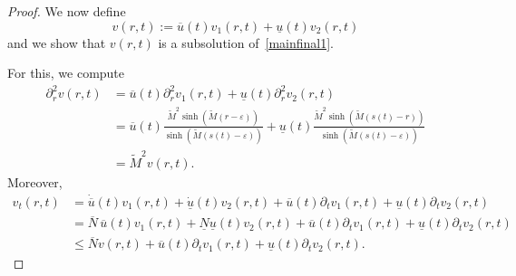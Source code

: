 \documentclass[12pt,a4paper,intlimits,sumlimits]{amsart}
\theoremstyle{definition}
\theoremstyle{plain}
\numberwithin{equation}{section}
\renewcommand{\leq}{\leqslant}
\begin{document}
\begin{proof}
We now define 
\[
v(r,t):=\overline{u}(t)v_1(r,t)+\underline{u}(t)v_2(r,t)
\]
and we show that $v(r, t)$ is a subsolution of~\eqref{mainfinal1}.

For this, we compute
\begin{equation}\label{xdftygvbnji}
\begin{split}
\partial^2_r v(r,t)&= \overline{u}(t)\partial^2_r v_1(r,t)+\underline{u}(t)\partial^2_r v_2(r,t)\\&=
\overline{u}(t)
\frac{\widetilde M^2\sinh(\widetilde M(r-\varepsilon))}{\sinh(\widetilde M(s(t)-\varepsilon))}
+\underline{u}(t)\frac{\widetilde M^2\sinh(\widetilde M(s(t)-r))}{\sinh(\widetilde M(s(t)-\varepsilon))}\\&=\widetilde M^2v(r,t).
\end{split}
\end{equation}
Moreover,
\begin{equation}\label{xdftygvbnji1}
\begin{split}
v_t(r,t)&=\dot{\overline{u}}(t)v_1(r,t)+\dot{\underline{u}}(t)v_2(r,t)+\overline{u}(t)\partial_t v_{1}(r,t)+\underline{u}(t)\partial_t v_{2}(r,t) \\
&=\overline{N} \,\overline{u}(t)v_1(r,t)+\underline{N}\underline{u}(t)v_2(r,t)+\overline{u}(t)\partial_t v_{1}(r,t)+\underline{u}(t)\partial_t v_{2}(r,t) \\
&\leq \overline{N} v(r,t)+\overline{u}(t)\partial_t v_{1}(r,t)+\underline{u}(t)\partial_t v_{2}(r,t).
\end{split}
\end{equation}


\end{proof}
\end{document}
